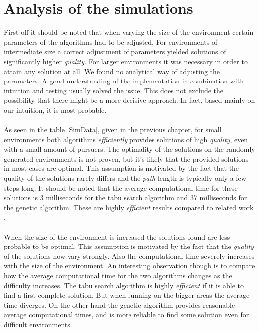 \section{Analysis of the simulations}
First off it should be noted that when varying the size of the environment certain parameters of the algorithms had to be adjusted. For environments of intermediate size a correct adjustment of parameters yielded solutions of significantly higher \emph{quality}. For larger environments it was necessary in order to attain any solution at all. We found no analytical way of adjusting the parameters. A good understanding of the implementation in combination with intuition and testing usually solved the issue. This does not exclude the possibility that there might be a more decisive approach. In fact, based mainly on our intuition, it is most probable.\\
\\As seen in the table \ref{SimData}, given in the previous chapter, for small environments both algorithms \emph{efficiently} provides solutions of high \emph{quality}, even with a small amount of pursuers. The optimality of the solutions on the randomly generated environments is not proven, but it's likely that the provided solutions in most cases are optimal. This assumption is motivated by the fact that the quality of the solutions rarely differs and the \emph{path} length is typically only a few steps long. It should be noted that the average computational time for these solutions is 3 milliseconds for the tabu search algorithm and 37 milliseconds for the genetic algorithm. These are highly \emph{efficient} results compared to related work \cite{paper1}.\\%
\\When the size of the environment is increased the solutions found are less probable to be optimal. This assumption is motivated by the fact that the \emph{quality} of the solutions now vary strongly. Also the computational time severely increases with the size of the environment. An interesting observation though is to compare how the average computational time for the two algorithms changes as the difficulty increases. The tabu search algorithm is highly \emph{efficient} if it is able to find a first complete solution. But when running on the bigger areas the average time diverges. On the other hand the genetic algorithm provides reasonable average computational times, and is more reliable to find some solution even for difficult environments.\\
